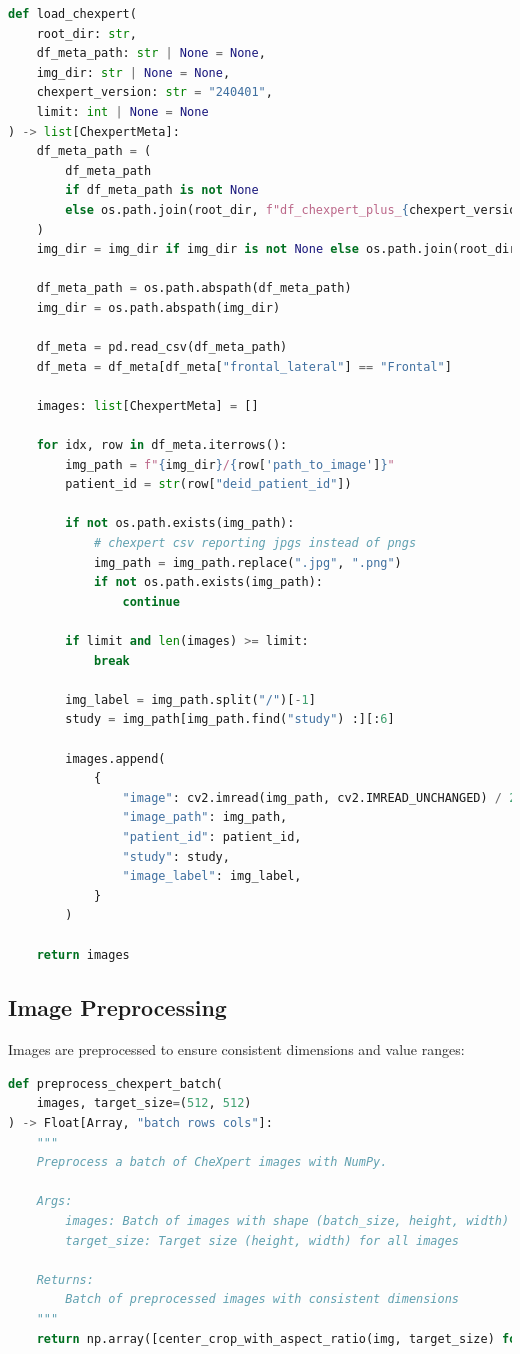 \documentclass[nomenclature, english, bibtex]{kththesis}
\numberwithin{listing}{chapter}
\begin{document}
\begin{lstlisting}[language=Python, caption=CheXpert dataset loader implementation]
def load_chexpert(
    root_dir: str,
    df_meta_path: str | None = None,
    img_dir: str | None = None,
    chexpert_version: str = "240401",
    limit: int | None = None
) -> list[ChexpertMeta]:
    df_meta_path = (
        df_meta_path
        if df_meta_path is not None
        else os.path.join(root_dir, f"df_chexpert_plus_{chexpert_version}.csv")
    )
    img_dir = img_dir if img_dir is not None else os.path.join(root_dir, "PNG")

    df_meta_path = os.path.abspath(df_meta_path)
    img_dir = os.path.abspath(img_dir)

    df_meta = pd.read_csv(df_meta_path)
    df_meta = df_meta[df_meta["frontal_lateral"] == "Frontal"]

    images: list[ChexpertMeta] = []

    for idx, row in df_meta.iterrows():
        img_path = f"{img_dir}/{row['path_to_image']}"
        patient_id = str(row["deid_patient_id"])

        if not os.path.exists(img_path):
            # chexpert csv reporting jpgs instead of pngs
            img_path = img_path.replace(".jpg", ".png")
            if not os.path.exists(img_path):
                continue

        if limit and len(images) >= limit:
            break

        img_label = img_path.split("/")[-1]
        study = img_path[img_path.find("study") :][:6]

        images.append(
            {
                "image": cv2.imread(img_path, cv2.IMREAD_UNCHANGED) / 255.0,
                "image_path": img_path,
                "patient_id": patient_id,
                "study": study,
                "image_label": img_label,
            }
        )

    return images
\end{lstlisting}

\subsection{Image Preprocessing}
Images are preprocessed to ensure consistent dimensions and value ranges:

\begin{lstlisting}[language=Python, caption=Image preprocessing function]
def preprocess_chexpert_batch(
    images, target_size=(512, 512)
) -> Float[Array, "batch rows cols"]:
    """
    Preprocess a batch of CheXpert images with NumPy.

    Args:
        images: Batch of images with shape (batch_size, height, width) or (batch_size, height, width, channels)
        target_size: Target size (height, width) for all images

    Returns:
        Batch of preprocessed images with consistent dimensions
    """
    return np.array([center_crop_with_aspect_ratio(img, target_size) for img in images])
\end{lstlisting}
\end{document}
